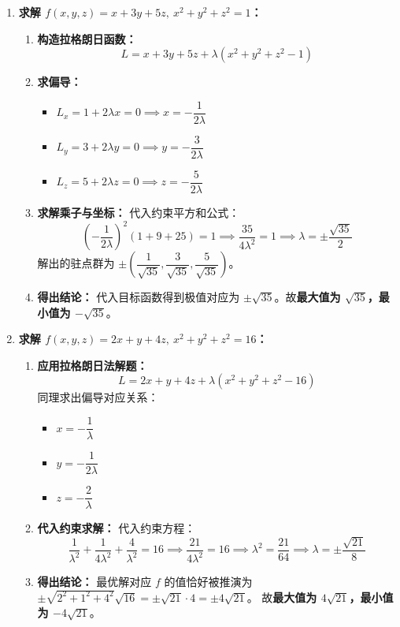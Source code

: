 \documentclass[lang=cn,11pt]{elegantbook}
\begin{document}
\begin{solution}
\begin{enumerate}
    \item[(3)] \textbf{求解 $f(x,y,z)=x+3y+5z,\ x^2+y^2+z^2=1$：}
    \begin{enumerate}
        \item \textbf{构造拉格朗日函数：}
        \[ L = x+3y+5z + \lambda(x^2+y^2+z^2-1) \]
        \item \textbf{求偏导：}
        \begin{itemize}
            \item $L_x = 1+2\lambda x = 0 \implies x = -\dfrac{1}{2\lambda}$
            \item $L_y = 3+2\lambda y = 0 \implies y = -\dfrac{3}{2\lambda}$
            \item $L_z = 5+2\lambda z = 0 \implies z = -\dfrac{5}{2\lambda}$
        \end{itemize}
        \item \textbf{求解乘子与坐标：}
        代入约束平方和公式：
        \[
        \left(-\frac{1}{2\lambda}\right)^2 (1+9+25) = 1 \implies \frac{35}{4\lambda^2} = 1 \implies \lambda = \pm \frac{\sqrt{35}}{2}
        \]
        解出的驻点群为 $\pm\left(\dfrac{1}{\sqrt{35}}, \dfrac{3}{\sqrt{35}}, \dfrac{5}{\sqrt{35}}\right)$。
        \item \textbf{得出结论：}
        代入目标函数得到极值对应为 $\pm \sqrt{35}$。故\textbf{最大值为 $\sqrt{35}$，最小值为 $-\sqrt{35}$}。
    \end{enumerate}

    \item[(4)] \textbf{求解 $f(x,y,z)=2x+y+4z,\ x^2+y^2+z^2=16$：}
    \begin{enumerate}
        \item \textbf{应用拉格朗日法解题：}
        \[ L = 2x+y+4z + \lambda(x^2+y^2+z^2-16) \]
        同理求出偏导对应关系：
        \begin{itemize}
            \item $x = -\dfrac{1}{\lambda}$
            \item $y = -\dfrac{1}{2\lambda}$
            \item $z = -\dfrac{2}{\lambda}$
        \end{itemize}
        \item \textbf{代入约束求解：}
        代入约束方程：
        \[
        \frac{1}{\lambda^2} + \frac{1}{4\lambda^2} + \frac{4}{\lambda^2} = 16 \implies \frac{21}{4\lambda^2} = 16 \implies \lambda^2 = \frac{21}{64} \implies \lambda = \pm \frac{\sqrt{21}}{8}
        \]
        \item \textbf{得出结论：}
        最优解对应 $f$ 的值恰好被推演为 $\pm \sqrt{2^2+1^2+4^2}\sqrt{16} = \pm \sqrt{21} \cdot 4 = \pm 4\sqrt{21}$。
        故\textbf{最大值为 $4\sqrt{21}$，最小值为 $-4\sqrt{21}$}。
    \end{enumerate}
\end{enumerate}
\end{solution}
\end{document}
